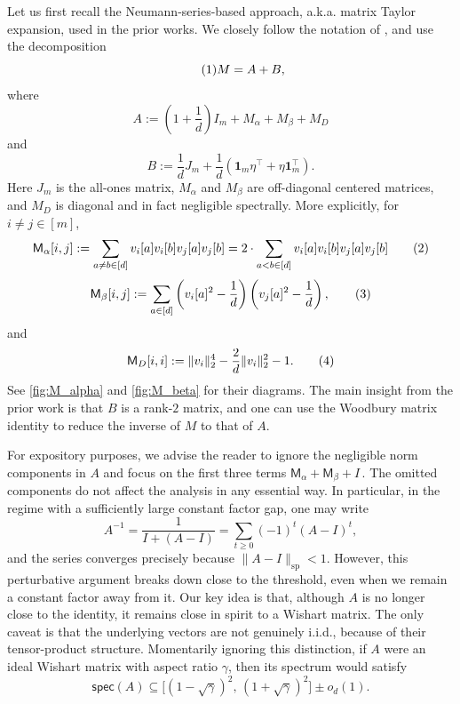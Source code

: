 \documentclass[12pt]{article}
\def \al {\alpha}
\newcommand\numberthis{\addtocounter{equation}{1}\tag{\theequation}}
\newcommand{\cm}{\mathsf{M} }
\begin{document}
Let us first recall the Neumann-series-based approach, a.k.a. matrix Taylor expansion, used in the prior works. We closely follow the notation of \cite{HKPX23}, and use the decomposition 
\[ \numberthis \label{eq:M-decomposition}
    M = A+B,
\]
where
\[
    A
    :=
    \left(1+\frac1d\right)I_m
    +
    M_\alpha+M_\beta+M_D  
\]
and
\[
    B
    :=
    \frac1d J_m
    +
    \frac1d
    \left(
        \mathbf 1_m\eta^\top+\eta\mathbf 1_m^\top
    \right).
\]
Here \(J_m\) is the all-ones matrix, \(M_\alpha\) and \(M_\beta\) are
off-diagonal centered matrices, and \(M_D\) is diagonal and in fact negligible spectrally.  More explicitly, for
\(i\ne j \in [m] \),
\[
    \cm_\alpha[i,j]
    :=
    \sum_{a\ne b\in[d]}
        v_i[a]v_i[b]v_j[a]v_j[b] = 2\cdot \sum_{a<b\in [d]} v_i[a]v_i[b]v_j[a]v_j[b] \numberthis \label{eq:M_al_def}
\]
\[
    \cm_\beta[i,j]
    :=
    \sum_{a\in[d]}
    \left(v_i[a]^2-\frac1d\right)
    \left(v_j[a]^2-\frac1d\right), \numberthis \label{eq:M_beta_def}
\]
and
\[
    \cm_D[i,i]
    :=
    \|v_i\|_2^4-\frac2d\|v_i\|_2^2-1. \numberthis \label{eq:M_D_def}
\]
See \cref{fig:M_alpha} and \cref{fig:M_beta} for their diagrams. The main insight from the prior work is that $B$ is a rank-$2$ matrix, and one can use the Woodbury matrix identity to reduce the inverse of $M$ to that %
of $A$. 

For expository purposes, we advise the reader to ignore the negligible norm components in $A$ and focus on the first three terms \(
 \cm_\al +\cm_\beta + I\,.
\)
The omitted components do not affect the analysis in any essential way.
In particular,
in the regime with a sufficiently large constant factor gap, one may write
\[
     {A}^{-1}
    =
    \frac{1}{I+( {A}-I)}
    =
    \sum_{t\geq 0} (-1)^t ( {A}-I)^t,
\]
and the series converges precisely because \(\|A-I\|_{\mathrm{sp}}<1\).
However, this perturbative argument breaks down close to the threshold, even
when we remain a constant factor away from it.
Our key idea is that, although \( A\) is no longer close to the identity,
it remains close in spirit to a Wishart matrix. The only caveat is that the
underlying vectors are not genuinely i.i.d., because of their tensor-product
structure. Momentarily ignoring this distinction, if \(  A\) were an ideal
Wishart matrix with aspect ratio \(\gamma\), then its spectrum would satisfy
\[
    \mathsf{spec}(A)
    \subseteq
    \bigl[(1-\sqrt{\gamma})^2,\,(1+\sqrt{\gamma})^2\bigr] \pm o_d(1).
\]
\end{document}
